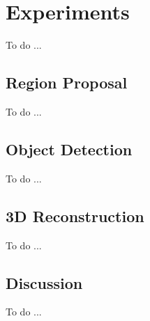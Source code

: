 \chapter{Experiments}\label{ch:experiments}
To do ...

\section{Region Proposal}\label{sec:exp_region_proposal}
To do ...

\section{Object Detection}\label{sec:exp_object_detection}
To do ...


\section{3D Reconstruction}\label{sec:exp_3d_reconstruction}
To do ...

\section{Discussion}\label{sec:exp_discussion}
To do ...